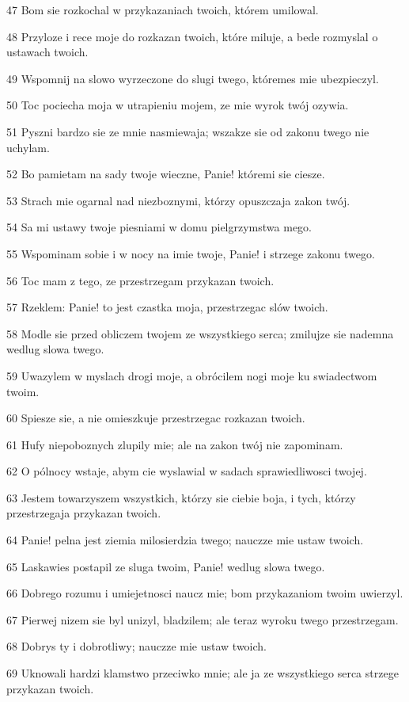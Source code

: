\par 47 Bom sie rozkochal w przykazaniach twoich, którem umilowal.
\par 48 Przyloze i rece moje do rozkazan twoich, które miluje, a bede rozmyslal o ustawach twoich.
\par 49 Wspomnij na slowo wyrzeczone do slugi twego, któremes mie ubezpieczyl.
\par 50 Toc pociecha moja w utrapieniu mojem, ze mie wyrok twój ozywia.
\par 51 Pyszni bardzo sie ze mnie nasmiewaja; wszakze sie od zakonu twego nie uchylam.
\par 52 Bo pamietam na sady twoje wieczne, Panie! któremi sie ciesze.
\par 53 Strach mie ogarnal nad niezboznymi, którzy opuszczaja zakon twój.
\par 54 Sa mi ustawy twoje piesniami w domu pielgrzymstwa mego.
\par 55 Wspominam sobie i w nocy na imie twoje, Panie! i strzege zakonu twego.
\par 56 Toc mam z tego, ze przestrzegam przykazan twoich.
\par 57 Rzeklem: Panie! to jest czastka moja, przestrzegac slów twoich.
\par 58 Modle sie przed obliczem twojem ze wszystkiego serca; zmilujze sie nademna wedlug slowa twego.
\par 59 Uwazylem w myslach drogi moje, a obrócilem nogi moje ku swiadectwom twoim.
\par 60 Spiesze sie, a nie omieszkuje przestrzegac rozkazan twoich.
\par 61 Hufy niepoboznych zlupily mie; ale na zakon twój nie zapominam.
\par 62 O pólnocy wstaje, abym cie wyslawial w sadach sprawiedliwosci twojej.
\par 63 Jestem towarzyszem wszystkich, którzy sie ciebie boja, i tych, którzy przestrzegaja przykazan twoich.
\par 64 Panie! pelna jest ziemia milosierdzia twego; nauczze mie ustaw twoich.
\par 65 Laskawies postapil ze sluga twoim, Panie! wedlug slowa twego.
\par 66 Dobrego rozumu i umiejetnosci naucz mie; bom przykazaniom twoim uwierzyl.
\par 67 Pierwej nizem sie byl unizyl, bladzilem; ale teraz wyroku twego przestrzegam.
\par 68 Dobrys ty i dobrotliwy; nauczze mie ustaw twoich.
\par 69 Uknowali hardzi klamstwo przeciwko mnie; ale ja ze wszystkiego serca strzege przykazan twoich.
